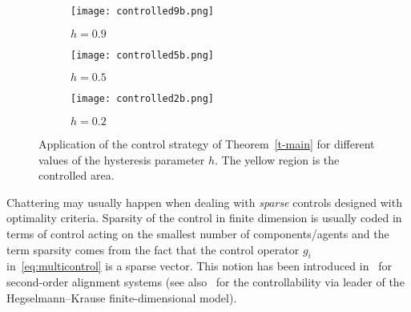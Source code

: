 \documentclass{article}
\theoremstyle{definition}\newtheorem{remark}{Remark}
\begin{document}
\newcommand{\larghezza}{\textwidth}
\begin{figure}[ht!]
\begin{subfigure}[ht]{\larghezza}
\texttt{[image: controlled9b.png]}
\caption{$h=  0.9$}
\end{subfigure}

\begin{subfigure}[ht]{\larghezza}
\texttt{[image: controlled5b.png]}
\caption{$h =  0.5$}
\end{subfigure}

\begin{subfigure}[ht]{\larghezza}
\texttt{[image: controlled2b.png]}
\caption{$h =  0.2$}
\end{subfigure}

\caption{Application of the control strategy of Theorem~\ref{t-main} for different values of the hysteresis parameter $h$. The yellow region is the controlled area.}
\label{fig:controlled}
\end{figure}







Chattering may usually happen when dealing with \emph{sparse} controls designed with optimality criteria. Sparsity of the control in finite dimension is usually coded in terms of control acting on the smallest number of components/agents and the term sparsity comes from the fact that the control operator $g_i$ in~\eqref{eq:multicontrol} is a sparse vector. This notion has been introduced in~\cite{CS-control, CS-control-1} for second-order alignment systems (see also~\cite{WCB} for the controllability via leader of the Hegselmann--Krause finite-dimensional model).
\end{document}
